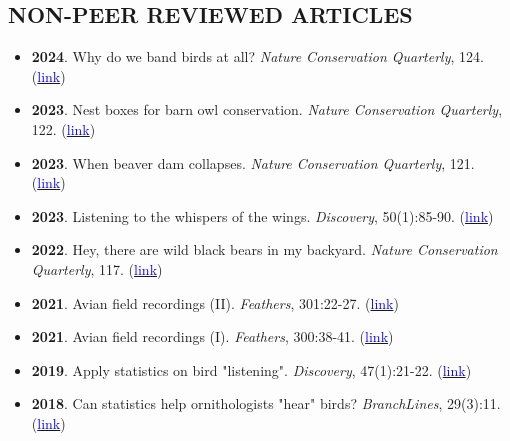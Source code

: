 \documentclass[11pt,letterpaper,sans]{moderncv}        %
\begin{document}
\subsection{NON-PEER REVIEWED ARTICLES}
\begin{itemize}

\item{\textbf{2024}. Why do we band birds at all? \textit{Nature Conservation Quarterly}}, 124. (\href{}{\textcolor{blue}{link}})
\vspace{3pt}

\item{\textbf{2023}. Nest boxes for barn owl conservation. \textit{Nature Conservation Quarterly}}, 122. (\href{https://github.com/SunnyTseng/sunny_cv/blob/main/2023-07-03_1336134904.pdf}{\textcolor{blue}{link}})
\vspace{3pt}

\item{\textbf{2023}. When beaver dam collapses. \textit{Nature Conservation Quarterly}}, 121. (\href{https://github.com/SunnyTseng/sunny_cv/blob/main/2023-04-17_0744599592.pdf}{\textcolor{blue}{link}})
\vspace{3pt}

\item{\textbf{2023}. Listening to the whispers of the wings. \textit{Discovery}}, 50(1):85-90. (\href{https://drive.google.com/file/d/1dJVMvOMULfuDzc_YATCUpOdxOxK6YwaX/view?usp=share_link}{\textcolor{blue}{link}})
\vspace{3pt}


\item{\textbf{2022}. Hey, there are wild black bears in my backyard. \textit{Nature Conservation Quarterly}}, 117. (\href{https://github.com/SunnyTseng/sunny_cv/blob/main/2022-03-31_1337080532.pdf}{\textcolor{blue}{link}})
\vspace{3pt}

\item{\textbf{2021}. Avian field recordings (II). \textit{Feathers}}, 301:22-27. (\href{https://www.bird.org.tw/feather}{\textcolor{blue}{link}})
\vspace{3pt}

\item{\textbf{2021}. Avian field recordings (I). \textit{Feathers}}, 300:38-41. (\href{https://www.bird.org.tw/feather}{\textcolor{blue}{link}})
\vspace{3pt}

\item{\textbf{2019}. Apply statistics on bird "listening". \textit{Discovery}}, 47(1):21-22. (\href{https://drive.google.com/open?id=1lZC8H246lFH-XCGI6vtBjXMIq1YqukUG}{\textcolor{blue}{link}})
\vspace{3pt}

\item{\textbf{2018}. Can statistics help ornithologists "hear" birds? \textit{BranchLines}}, 29(3):11. (\href{https://forestry.ubc.ca/files/2019/04/bl-29.3.pdf#page=11}{\textcolor{blue}{link}}) 
\vspace{3pt}

\end{itemize}
\end{document}
